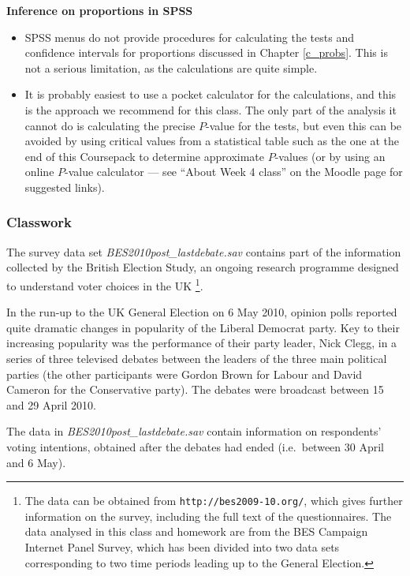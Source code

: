 \textbf{Inference on proportions in SPSS}
\begin{itemize}
\item
SPSS menus do not provide procedures for calculating the tests
and confidence intervals for proportions discussed in Chapter \ref{c_probs}.
This is not a serious limitation, as the calculations are quite simple.
\item
It is probably easiest to use a pocket calculator for the calculations, and
this is the approach we recommend for this class.
The only part of the analysis it cannot do is calculating
the precise $P$-value for the tests, but even this can be avoided by
using critical values from a statistical table such as the one at the
end of this Coursepack to determine approximate $P$-values (or by using
an online $P$-value calculator --- see ``About Week 4 class'' on the
Moodle page for suggested links).
\end{itemize}

\subsubsection{Classwork}

The survey data set \emph{BES2010post\_lastdebate.sav} contains part of the
information collected by the British Election Study, an ongoing
research programme designed to understand voter choices in the UK
\footnote{The data can be obtained from
\texttt{http://bes2009-10.org/}, which gives further information on
the survey, including the full text of the questionnaires. The data
analysed in this class and homework are from the BES Campaign Internet Panel Survey,
which has been divided into two data sets corresponding to two time periods
leading up to the General Election.}.

In the run-up to the UK General Election on 6 May 2010, opinion polls reported quite dramatic
changes in popularity of the Liberal Democrat party. Key to their increasing popularity was the
 performance of their party leader, Nick Clegg, in a series of three televised debates
between the leaders of the three main political parties (the other participants were Gordon Brown
for Labour and David Cameron for the Conservative party). The debates were broadcast between
15 and 29 April 2010.

The data in \emph{BES2010post\_lastdebate.sav} contain information on respondents' voting intentions,
obtained after the debates had ended (i.e.\ between 30 April and 6 May).

